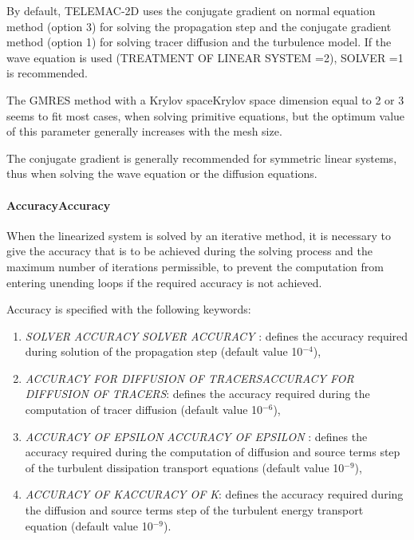 \documentclass{article} %
\begin{document}
 By default, TELEMAC-2D uses the conjugate gradient on normal equation method (option 3) for solving the propagation step and the conjugate gradient method (option 1) for solving tracer diffusion and the turbulence model. If the wave equation is used (TREATMENT OF LINEAR SYSTEM =2), SOLVER =1 is recommended.

 The GMRES method with a Krylov spaceKrylov space dimension equal to 2 or 3 seems to fit most cases, when solving primitive equations, but the optimum value of this parameter generally increases with the mesh size.

 The conjugate gradient is generally recommended for symmetric linear systems, thus when solving the wave equation or the diffusion equations.


\paragraph{ AccuracyAccuracy}

 When the linearized system is solved by an iterative method, it is necessary to give the accuracy that is to be achieved during the solving process and the maximum number of iterations permissible, to prevent the computation from entering unending loops if the required accuracy is not achieved.

 Accuracy is specified with the following keywords:

\begin{enumerate}
\item  \textit{SOLVER ACCURACY} \textit{SOLVER ACCURACY} : defines the accuracy required during solution of the propagation step (default value 10${}^{-4}$),

\item  \textit{ACCURACY FOR DIFFUSION OF TRACERSACCURACY FOR DIFFUSION OF TRACERS}: defines the accuracy required during the computation of tracer diffusion (default value 10${}^{-6}$),

\item  \textit{ACCURACY OF EPSILON} \textit{ACCURACY OF EPSILON} : defines the accuracy required during the computation of diffusion and source terms step of the turbulent dissipation transport equations (default value 10${}^{-9}$),

\item  \textit{ACCURACY OF KACCURACY OF K}: defines the accuracy required during the diffusion and source terms step of the turbulent energy transport equation (default value 10${}^{-9}$).
\end{enumerate}
\end{document}
